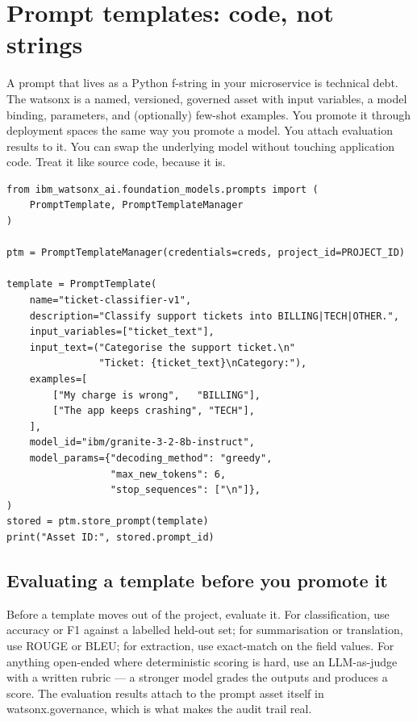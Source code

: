 \section{Prompt templates: code, not strings}

A prompt that lives as a Python f-string in your microservice is technical debt. The watsonx  is a named, versioned, governed asset with input variables, a model binding, parameters, and (optionally) few-shot examples. You promote it through deployment spaces the same way you promote a model. You attach evaluation results to it. You can swap the underlying model without touching application code. Treat it like source code, because it is.

\begin{examplebox}[title=\textbf{Create and store a prompt template}]
\begin{lstlisting}[style=pythonstyle]
from ibm_watsonx_ai.foundation_models.prompts import (
    PromptTemplate, PromptTemplateManager
)

ptm = PromptTemplateManager(credentials=creds, project_id=PROJECT_ID)

template = PromptTemplate(
    name="ticket-classifier-v1",
    description="Classify support tickets into BILLING|TECH|OTHER.",
    input_variables=["ticket_text"],
    input_text=("Categorise the support ticket.\n"
                "Ticket: {ticket_text}\nCategory:"),
    examples=[
        ["My charge is wrong",   "BILLING"],
        ["The app keeps crashing", "TECH"],
    ],
    model_id="ibm/granite-3-2-8b-instruct",
    model_params={"decoding_method": "greedy",
                  "max_new_tokens": 6,
                  "stop_sequences": ["\n"]},
)
stored = ptm.store_prompt(template)
print("Asset ID:", stored.prompt_id)
\end{lstlisting}
\end{examplebox}

\subsection{Evaluating a template before you promote it}

Before a template moves out of the project, evaluate it. For classification, use accuracy or F1 against a labelled held-out set; for summarisation or translation, use ROUGE or BLEU; for extraction, use exact-match on the field values. For anything open-ended where deterministic scoring is hard, use an LLM-as-judge with a written rubric --- a stronger model grades the outputs and produces a score. The evaluation results attach to the prompt asset itself in watsonx.governance, which is what makes the audit trail real.

